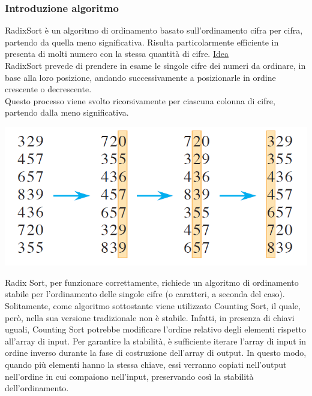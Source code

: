 \documentclass[a4paper, 11pt]{article}
\begin{document}
\subsubsection*{Introduzione algoritmo}
RadixSort è un algoritmo di ordinamento basato sull'ordinamento cifra per cifra, partendo da quella meno significativa. Risulta particolarmente efficiente in presenta di molti numero con la stessa quantità di cifre.\bigbreak
\noindent \underline{Idea}\\
RadixSort prevede di prendere in esame le singole cifre dei numeri da ordinare, in base alla loro posizione, andando successivamente a posizionarle in ordine crescente o decrescente.\\
Questo processo viene svolto ricorsivamente per ciascuna colonna di cifre, partendo dalla meno significativa.


\begin{center}
    \hfill
    \includegraphics[scale=0.5]{./Immagini/RadixSort.png}
    \hspace*{\fill}
    
    \par\vspace{0.3em} %
\end{center}
Radix Sort, per funzionare correttamente, richiede un algoritmo di ordinamento stabile per l'ordinamento delle singole cifre (o caratteri, a seconda del caso).\bigbreak
\noindent Solitamente, come algoritmo sottostante viene utilizzato Counting Sort, il quale, però, nella sua versione tradizionale non è stabile. Infatti, in presenza di chiavi uguali, Counting Sort potrebbe modificare l'ordine relativo degli elementi rispetto all'array di input.\bigbreak
\noindent Per garantire la stabilità, è sufficiente iterare l'array di input in ordine inverso durante la fase di costruzione dell'array di output. In questo modo, quando più elementi hanno la stessa chiave, essi verranno copiati nell'output nell'ordine in cui compaiono nell'input, preservando così la stabilità dell'ordinamento.
\end{document}
